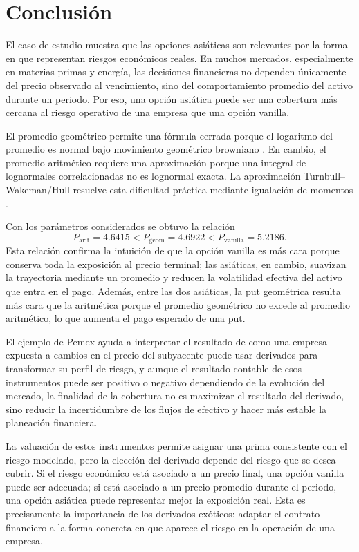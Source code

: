 \documentclass[11pt,letterpaper]{article}
\begin{document}
\section{Conclusión}

El caso de estudio muestra que las opciones asiáticas son relevantes por la forma en que representan riesgos económicos reales. En muchos mercados, especialmente en materias primas y energía, las decisiones financieras no dependen únicamente del precio observado al vencimiento, sino del comportamiento promedio del activo durante un periodo. Por eso, una opción asiática puede ser una cobertura más cercana al riesgo operativo de una empresa que una opción vanilla.

El promedio geométrico permite una fórmula cerrada porque el logaritmo del promedio es normal bajo movimiento geométrico browniano \citep{kemna1990}. En cambio, el promedio aritmético requiere una aproximación porque una integral de lognormales correlacionadas no es lognormal exacta. La aproximación Turnbull--Wakeman/Hull resuelve esta dificultad práctica mediante igualación de momentos \citep{turnbull1991,hull2018}. 

Con los parámetros considerados se obtuvo la relación
\[
P_{\mathrm{arit}}=4.6415<P_{\mathrm{geom}}=4.6922<P_{\mathrm{vanilla}}=5.2186.
\]
Esta relación confirma la intuición de que la opción vanilla es más cara porque conserva toda la exposición al precio terminal; las asiáticas, en cambio, suavizan la trayectoria mediante un promedio y reducen la volatilidad efectiva del activo que entra en el pago. Además, entre las dos asiáticas, la put geométrica resulta más cara que la aritmética porque el promedio geométrico no excede al promedio aritmético, lo que aumenta el pago esperado de una put.

El ejemplo de Pemex ayuda a interpretar el resultado de como una empresa expuesta a cambios en el precio del subyacente puede usar derivados para transformar su perfil de riesgo, y aunque el resultado contable de esos instrumentos puede ser positivo o negativo dependiendo de la evolución del mercado, la finalidad de la cobertura no es maximizar el resultado del derivado, sino reducir la incertidumbre de los flujos de efectivo y hacer más estable la planeación financiera.

La valuación de estos instrumentos permite asignar una prima consistente con el riesgo modelado, pero la elección del derivado depende del riesgo que se desea cubrir. Si el riesgo económico está asociado a un precio final, una opción vanilla puede ser adecuada; si está asociado a un precio promedio durante el periodo, una opción asiática puede representar mejor la exposición real. Esta es precisamente la importancia de los derivados exóticos: adaptar el contrato financiero a la forma concreta en que aparece el riesgo en la operación de una empresa.

\newpage
\nocite{curso2026}


\end{document}
